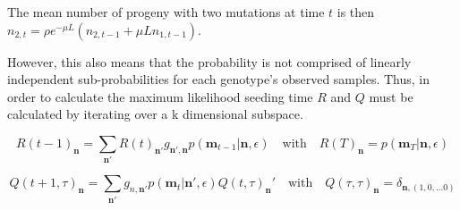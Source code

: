 \documentclass[aps,rmp, onecolumn]{revtex4}
\begin{document}
The mean number of progeny with two mutations  at time $t$ is then $n_{2,t} = \rho e^{-\mu L} (n_{2,t-1} + \mu L n_{1, t-1})$.

However, this also means that the probability is not comprised of linearly independent sub-probabilities for each genotype's observed samples. Thus, in order to calculate the maximum likelihood seeding time $R$ and $Q$ must be calculated by iterating over a k dimensional subspace. 

\begin{equation}
    R(t-1)_{\textbf{n}} = \sum_{\textbf{n}'} R(t)_{\textbf{n}'} g_{\textbf{n}',\textbf{n}} p(\textbf{m}_{t-1}|\textbf{n},\epsilon) \quad \mathrm{with} \quad R(T)_\textbf{n} = p(\textbf{m}_{T}|\textbf{n},\epsilon)
\end{equation}

\begin{equation}
    Q(t+1,\tau)_{\textbf{n}} = \sum_{\textbf{n}'} g_{n,\textbf{n}'} p(\textbf{m}_t|\textbf{n}',\epsilon) Q(t,\tau)_{\textbf{n}}'  \quad \mathrm{with} \quad Q(\tau,\tau)_{\textbf{n}} = \delta_{{\textbf{n}},(1,0,... 0)}
\end{equation}
\end{document}
